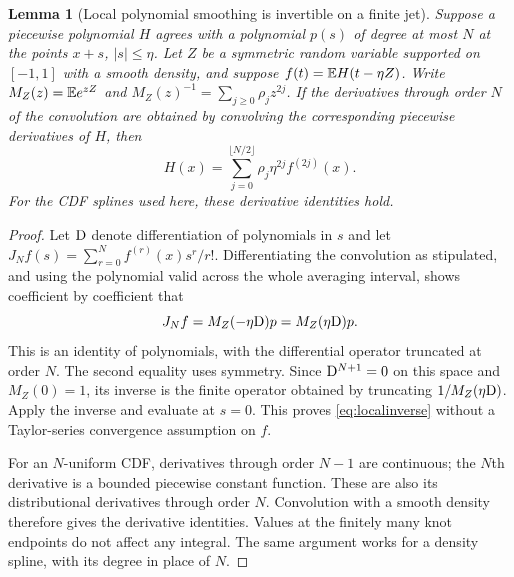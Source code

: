 \documentclass[11pt,oneside]{article}
\newtheorem{lemma}[theorem]{Lemma}
\theoremstyle{definition}\newtheorem{definition}[theorem]{Definition}
\theoremstyle{remark}\newtheorem{remark}[theorem]{Remark}
\begin{document}
\begin{lemma}[Local polynomial smoothing is invertible on a finite jet]
\label{lem:localinverse}
Suppose a piecewise polynomial $H$ agrees with a polynomial $p(s)$ of degree
at most $N$ at the points $x+s$, $|s|\le\eta$. Let $Z$ be a symmetric random
variable supported on $[-1,1]$ with a smooth density, and suppose
$f(t)=\mathbb E H(t-\eta Z)$. Write
$M_Z(z)=\mathbb E e^{zZ}$ and $M_Z(z)^{-1}=\sum_{j\ge0}\rho_jz^{2j}$.
If the derivatives through order $N$ of the convolution are obtained by
convolving the corresponding piecewise derivatives of $H$, then
\begin{equation}
 H(x)=\sum_{j=0}^{\lfloor N/2\rfloor}
       \rho_j\eta^{2j}f^{(2j)}(x).
 \label{eq:localinverse}
\end{equation}
For the CDF splines used here, these derivative identities hold.
\end{lemma}
\begin{proof}
Let $\mathrm D$ denote differentiation of polynomials in $s$ and let
$J_Nf(s)=\sum_{r=0}^N f^{(r)}(x)s^r/r!$. Differentiating the convolution
as stipulated, and using the polynomial valid across the whole averaging
interval, shows coefficient by coefficient that
\[
 J_Nf=M_Z(-\eta\mathrm D)p=M_Z(\eta\mathrm D)p.
\]
This is an identity of polynomials, with the differential operator truncated
at order $N$. The second equality uses symmetry. Since $\mathrm D^{N+1}=0$ on
this space and $M_Z(0)=1$, its inverse is the finite operator obtained by
truncating $1/M_Z(\eta\mathrm D)$. Apply the inverse and evaluate at $s=0$.
This proves \eqref{eq:localinverse} without a Taylor-series convergence
assumption on $f$.

For an $N$-uniform CDF, derivatives through order $N-1$ are continuous;
the $N$th derivative is a bounded piecewise constant function. These are
also its distributional derivatives through order $N$. Convolution with a
smooth density therefore gives the derivative identities. Values at the
finitely many knot endpoints do not affect any integral. The same argument
works for a density spline, with its degree in place of $N$.
\end{proof}
\end{document}
